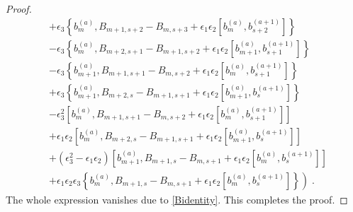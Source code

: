 \documentclass[11pt]{article}
\numberwithin{equation}{section}
\numberwithin{figure}{section}
\numberwithin{table}{section}
\begin{document}
\begin{proof}
\begin{align}
		&+\epsilon_3\left\{b^{(a)}_{m},B_{m+1,s+2}-B_{m,s+3}+\epsilon_1\epsilon_2\left[b^{(a)}_m,b^{(a+1)}_{s+2}\right]\right\}\nonumber\\
		&-\epsilon_3\left\{b^{(a)}_{m},B_{m+2,s+1}-B_{m+1,s+2}+\epsilon_1\epsilon_2\left[b^{(a)}_{m+1},b^{(a+1)}_{s+1}\right]\right\}\nonumber\\
		&-\epsilon_3\left\{b^{(a)}_{m+1},B_{m+1,s+1}-B_{m,s+2}+\epsilon_1\epsilon_2\left[b^{(a)}_m,b^{(a+1)}_{s+1}\right]\right\}\nonumber\\
		&+\epsilon_3\left\{b^{(a)}_{m+1},B_{m+2,s}-B_{m+1,s+1}+\epsilon_1\epsilon_2\left[b^{(a)}_{m+1},b^{(a+1)}_s\right]\right\}\nonumber\\
		&-\epsilon_3^2\left[b^{(a)}_m,B_{m+1,s+1}-B_{m,s+2}+\epsilon_1\epsilon_2\left[b^{(a)}_m,b^{(a+1)}_{s+1}\right]\right]\nonumber\\
		&+\epsilon_1\epsilon_2\left[b^{(a)}_m,B_{m+2,s}-B_{m+1,s+1}+\epsilon_1\epsilon_2\left[b^{(a)}_{m+1},b^{(a+1)}_s\right]\right]\nonumber\\
		&+\left(\epsilon_3^2-\epsilon_1\epsilon_2\right)\left[b^{(a)}_{m+1},B_{m+1,s}-B_{m,s+1}+\epsilon_1\epsilon_2\left[b^{(a)}_m,b^{(a+1)}_s\right]\right]\nonumber\\
		&\left.+\epsilon_1\epsilon_2\epsilon_3\left\{b^{(a)}_m,B_{m+1,s}-B_{m,s+1}+\epsilon_1\epsilon_2\left[b^{(a)}_m,b^{(a+1)}_s\right]\right\}\right)\;.
	\end{align}
	The whole expression vanishes due to \eqref{Bidentity}. This completes the proof.
\end{proof}
\end{document}
